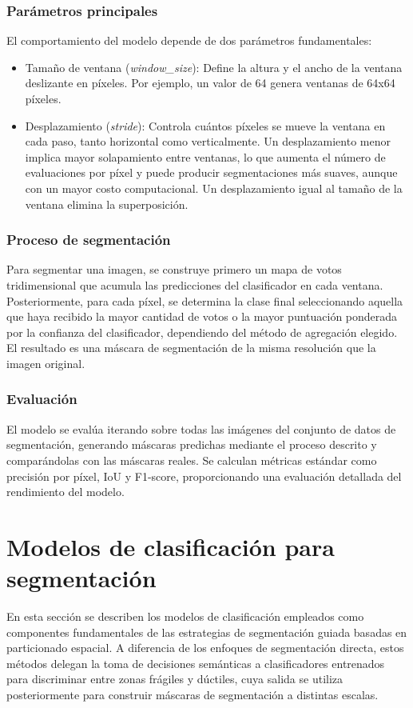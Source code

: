 \documentclass[onecolumn, 12pt , journal]{IEEEtran}
\begin{document}
\subsubsection{Parámetros principales}

El comportamiento del modelo depende de dos parámetros fundamentales:

\begin{itemize}
  \item Tamaño de ventana (\textit{window\_size}): Define la altura y el ancho de la ventana deslizante en píxeles. Por ejemplo, un valor de 64 genera ventanas de 64x64 píxeles.
  \item Desplazamiento (\textit{stride}): Controla cuántos píxeles se mueve la ventana en cada paso, tanto horizontal como verticalmente. Un desplazamiento menor implica mayor solapamiento entre ventanas, lo que aumenta el número de evaluaciones por píxel y puede producir segmentaciones más suaves, aunque con un mayor costo computacional. Un desplazamiento igual al tamaño de la ventana elimina la superposición.
\end{itemize}

\subsubsection{Proceso de segmentación}

Para segmentar una imagen, se construye primero un mapa de votos tridimensional que acumula las predicciones del clasificador en cada ventana. Posteriormente, para cada píxel, se determina la clase final seleccionando aquella que haya recibido la mayor cantidad de votos o la mayor puntuación ponderada por la confianza del clasificador, dependiendo del método de agregación elegido. El resultado es una máscara de segmentación de la misma resolución que la imagen original.

\subsubsection{Evaluación}

El modelo se evalúa iterando sobre todas las imágenes del conjunto de datos de segmentación, generando máscaras predichas mediante el proceso descrito y comparándolas con las máscaras reales. Se calculan métricas estándar como precisión por píxel, IoU y F1-score, proporcionando una evaluación detallada del rendimiento del modelo.

\section{Modelos de clasificación para segmentación}
En esta sección se describen los modelos de clasificación empleados como componentes fundamentales de las estrategias de segmentación guiada basadas en particionado espacial. A diferencia de los enfoques de segmentación directa, estos métodos delegan la toma de decisiones semánticas a clasificadores entrenados para discriminar entre zonas frágiles y dúctiles, cuya salida se utiliza posteriormente para construir máscaras de segmentación a distintas escalas.
\end{document}
